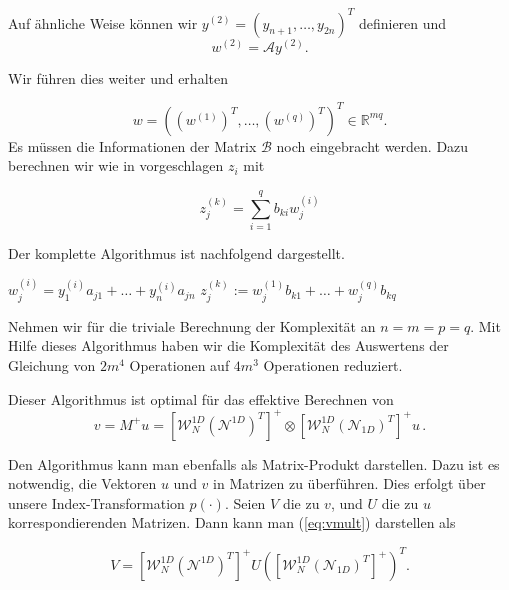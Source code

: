 Auf ähnliche Weise können wir $y^{(2)}=(y_{n+1},\dots,y_{2n})^{T}$ definieren und
\begin{equation*}
w^{(2)} = \mathcal{A}y^{(2)}.
\end{equation*}

Wir führen dies weiter und erhalten

\begin{equation*}
w=( (w^{(1)})^T , \dots, (w^{(q)})^T)^T \in \mathbb{R}^{mq}.
\end{equation*}
Es müssen die Informationen der Matrix $\mathcal{B}$ noch eingebracht werden. Dazu berechnen wir wie in \cite{Teachlet} vorgeschlagen $z_i$ mit

\begin{equation*}
z^{(k)}_j = \sum_{i=1}^{q} b_{ki} w_j^{(i)}
\end{equation*}

Der komplette Algorithmus ist nachfolgend dargestellt.
\begin{mdframed}[backgroundcolor=blue!3] 
\begin{algorithmic}
			\State $w^{(i)}_{j} = y^{(i)}_1 a_{j1} + \dots + y^{(i)}_n a_{jn}$
	\EndFor
\EndFor
{}
			\State $z^{(k)}_j := w^{(1)}_j b_{k1} + \dots + w^{(q)}_j b_{kq}$
	\EndFor
\EndFor

\end{algorithmic}
\end{mdframed}


Nehmen wir für die triviale Berechnung der Komplexität an $n=m=p=q$.
Mit Hilfe dieses Algorithmus haben wir die Komplexität des Auswertens der Gleichung von $2m^4$ Operationen auf $4m^3$ Operationen reduziert.

Dieser Algorithmus ist optimal für das effektive Berechnen von
\begin{equation} \label{eq:vmult}
v=M^+u=[\mathcal{W}_N^{1D} (\mathcal{N}^{1D})^T]^+ \otimes [\mathcal{W}_N^{1D} (\mathcal{N}_{1D})^T]^+ u \,.
\end{equation}

Den Algorithmus kann man ebenfalls als Matrix-Produkt darstellen. Dazu ist es notwendig, die Vektoren $u$ und $v$ in Matrizen zu überführen. Dies erfolgt über unsere Index-Transformation $p(\cdot)$. Seien $V$ die zu $v$, und $U$ die zu $u$ korrespondierenden Matrizen. Dann kann man (\ref{eq:vmult}) darstellen als

\begin{equation}
V= [\mathcal{W}_N^{1D} (\mathcal{N}^{1D})^T]^+ U ([\mathcal{W}_N^{1D} (\mathcal{N}_{1D})^T]^+)^T.
\end{equation}

